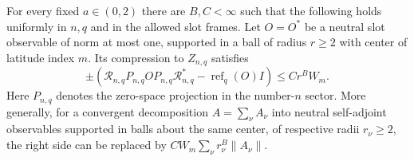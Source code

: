 \begin{theorem}
\label{thm:flags-local-readout}
For every fixed $a\in(0,2)$ there are $B,C<\infty$ such that the
following holds uniformly in $n,q$ and in the allowed slot frames.
Let $O=O^*$ be a neutral slot observable of norm at most one, supported
in a ball of radius $r\geq2$ with center of latitude index $m$.  Its
compression to $Z_{n,q}$ satisfies
\begin{equation}
 \pm\left(
 \mathcal R_{n,q}P_{n,q}OP_{n,q}\mathcal R_{n,q}^*
       -\operatorname{ref}_q(O)I\right)
 \leq C r^B W_m.
 \label{eq:flags-local-readout}
\end{equation}
Here $P_{n,q}$ denotes the zero-space projection in the number-$n$
sector.  More generally, for a convergent decomposition
$A=\sum_\nu A_\nu$ into neutral self-adjoint observables supported in
balls about the same center, of respective radii $r_\nu\geq2$, the
right side can be replaced by
$CW_m\sum_\nu r_\nu^B\|A_\nu\|$.
\end{theorem}

